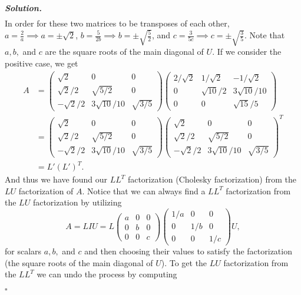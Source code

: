 \documentclass[12pt]{report}
\newenvironment{solution}[1][\it{Solution}]{\textbf{#1. } }{$\square$}
\begin{document}
\begin{solution}
\begin{align*}
    \end{align*}
    In order for these two matrices to be transposes of each other, $a = \frac{2}{a} \implies a = \pm \sqrt{2}$, $b = \frac{5}{2b} \implies b = \pm \sqrt{\frac{5}{2}}$, and $c = \frac{3}{5c} \implies c = \pm \sqrt{\frac{3}{5}}.$ Note that $a,b,$ and $c$ are the square roots of the main diagonal of $U$. If we consider the positive case, we get
    \begin{align*}
        A &= \begin{pmatrix}\sqrt{2}&0&0\\ \sqrt{2}/2&\sqrt{5/2}&0\\ -\sqrt{2}/2&3\sqrt{10}/10&\sqrt{3/5}\end{pmatrix} \begin{pmatrix}2/\sqrt{2}&1/\sqrt{2}&-1/\sqrt{2}\\ 0&\sqrt{10}/2&3\sqrt{10}/10\\ 0&0&\sqrt{15}/5\end{pmatrix}\\
        &=\begin{pmatrix}\sqrt{2}&0&0\\ \sqrt{2}/2&\sqrt{5/2}&0\\ -\sqrt{2}/2&3\sqrt{10}/10&\sqrt{3/5}\end{pmatrix}\begin{pmatrix}\sqrt{2}&0&0\\ \sqrt{2}/2&\sqrt{5/2}&0\\ -\sqrt{2}/2&3\sqrt{10}/10&\sqrt{3/5}\end{pmatrix}^T\\
        &= L'(L')^T.
    \end{align*}
    And thus we have found our $LL^T$ factorization (Cholesky factorization) from the $LU$ factorization of $A$. Notice that we can always find a $LL^T$ factorization from the $LU$ factorization by utilizing
    \[ A = LIU = L \begin{pmatrix}
        a&0&0\\0&b&0\\0&0&c
    \end{pmatrix}\begin{pmatrix}
        1/a&0&0\\0&1/b&0\\0&0&1/c
    \end{pmatrix} U,\]
    for scalars $a,b,$ and $c$ and then choosing their values to satisfy the factorization (the square roots of the main diagonal of $U$). To get the $LU$ factorization from the $LL^T$ we can undo the process by computing

\end{solution}
\end{document}
